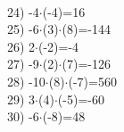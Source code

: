 \documentclass[a4paper,10pt]{article}
\begin{document}
\vspace{0.5cm}\\24)   -4$\cdot$(-4)=16
\vspace{0.5cm}\\25)   -6$\cdot$(3)$\cdot$(8)=-144
\vspace{0.5cm}\\26)   2$\cdot$(-2)=-4
\vspace{0.5cm}\\27)   -9$\cdot$(2)$\cdot$(7)=-126
\vspace{0.5cm}\\28)   -10$\cdot$(8)$\cdot$(-7)=560
\vspace{0.5cm}\\29)   3$\cdot$(4)$\cdot$(-5)=-60
\vspace{0.5cm}\\30)   -6$\cdot$(-8)=48
\vspace{0.5cm}\\\pagebreak
\end{document}
